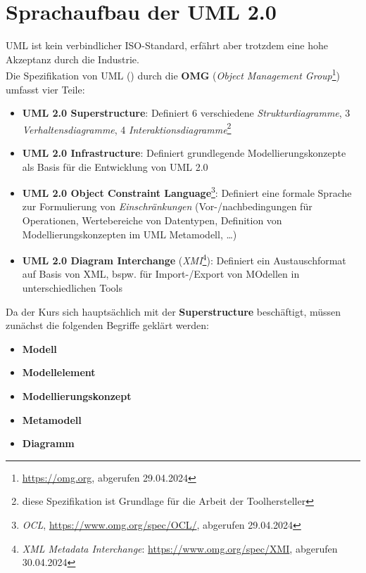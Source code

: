 \section{Sprachaufbau der UML 2.0}\label{sec:sprachaufbau-der-uml-2.0}

UML ist kein verbindlicher ISO-Standard, erfährt aber trotzdem eine hohe Akzeptanz durch die Industrie.\\

\noindent
Die Spezifikation von UML (\cite{OMG17}) durch die \textbf{OMG} (\textit{Object Management Group}\footnote{
    \url{https://omg.org}, abgerufen 29.04.2024
}) umfasst vier Teile:

\begin{itemize}
    \item \textbf{UML 2.0 Superstructure}: Definiert 6 verschiedene \textit{Strukturdiagramme}, 3 \textit{Verhaltensdiagramme}, 4 \textit{Interaktionsdiagramme}\footnote{
    diese Spezifikation ist Grundlage für die Arbeit der Toolhersteller
    }
    \item \textbf{UML 2.0 Infrastructure}: Definiert grundlegende Modellierungskonzepte als Basis für die Entwicklung von UML 2.0
    \item \textbf{UML 2.0 Object Constraint Language}\footnote{
    \textit{OCL}, \url{https://www.omg.org/spec/OCL/}, abgerufen 29.04.2024
    }: Definiert eine formale Sprache zur Formulierung von \textit{Einschränkungen} (Vor-/nachbedingungen für Operationen, Wertebereiche von Datentypen, Definition von Modellierungskonzepten im UML Metamodell, \ldots)
    \item \textbf{UML 2.0 Diagram Interchange} (\textit{XMI}\footnote{
    \textit{XML Metadata Interchange}: \url{https://www.omg.org/spec/XMI}, abgerufen 30.04.2024
    }): Definiert ein Austauschformat auf Basis von XML, bspw. für Import-/Export von MOdellen in unterschiedlichen Tools
\end{itemize}


\noindent
Da der Kurs sich hauptsächlich mit der \textbf{Superstructure} beschäftigt, müssen zunächst die folgenden Begriffe geklärt werden:

\begin{itemize}
    \item \textbf{Modell}
    \item \textbf{Modellelement}
    \item \textbf{Modellierungskonzept}
    \item \textbf{Metamodell}
    \item \textbf{Diagramm}
\end{itemize}

